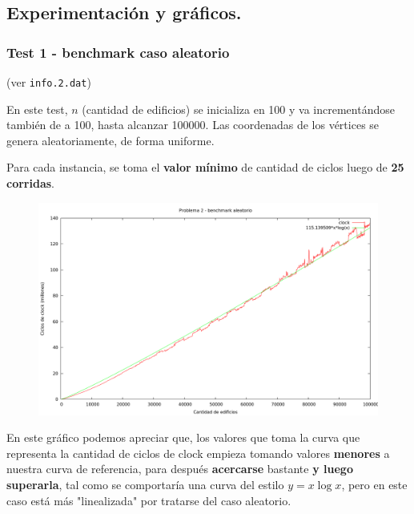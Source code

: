 \newpage


\subsection{Experimentación y gráficos.}

\vspace*{0.3cm}

\subsubsection{Test 1 - benchmark caso aleatorio}

(ver \verb|info.2.dat|) \medskip

En este test, $n$ (cantidad de edificios) se inicializa en 100 y va incrementándose también de a 100, 
hasta alcanzar 100000. Las coordenadas de los vértices se genera aleatoriamente, de forma uniforme.
 
Para cada instancia, se toma el \textbf{valor mínimo} de cantidad de ciclos luego de \textbf{25 corridas}. 

\vspace*{0.5cm}

\begin{figure}[h]
  \begin{center}
    \includegraphics[scale=0.35]{imagenes/grafico-2.png}
  \end{center}
\end{figure}

\vspace*{0.5cm}

En este gráfico podemos apreciar que, los valores que toma la curva que representa la cantidad de ciclos 
de clock empieza tomando valores \textbf{menores} a nuestra curva de referencia, para después \textbf{acercarse} bastante \textbf{y 
luego superarla}, tal como se comportaría una curva del estilo $y = x \log x$, pero en este caso está más 
"linealizada" por tratarse del caso aleatorio.

